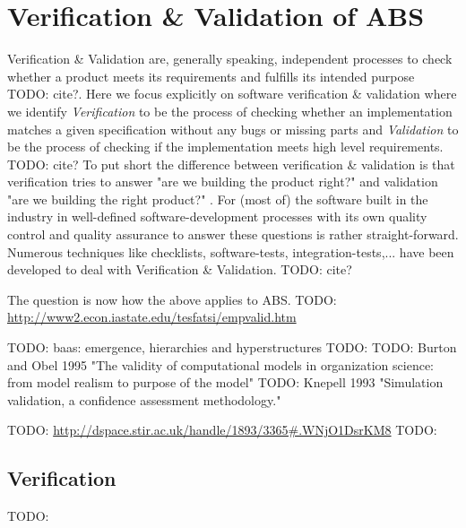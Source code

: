 \section{Verification \& Validation of ABS}
Verification \& Validation are, generally speaking, independent processes to check whether a product meets its requirements and fulfills its intended purpose TODO: cite?. Here we focus explicitly on software verification \& validation where we identify \textit{Verification} to be the process of checking whether an implementation matches a given specification without any bugs or missing parts and \textit{Validation} to be the process of checking if the implementation meets high level requirements. TODO: cite?
To put short the difference between verification \& validation is that verification tries to answer "are we building the product right?" and validation "are we building the right product?" \cite{boehm_software_1989}. For (most of) the software built in the industry in well-defined software-development processes with its own quality control and quality assurance to answer these questions is rather straight-forward. Numerous techniques like checklists, software-tests, integration-tests,... have been developed to deal with Verification \& Validation. TODO: cite?

The question is now how the above applies to ABS. TODO: \url{http://www2.econ.iastate.edu/tesfatsi/empvalid.htm}

TODO: baas: emergence, hierarchies and hyperstructures
TODO: \cite{baas_emergence_1997}
TODO: Burton and Obel 1995 "The validity of computational models in organization science: from model realism to purpose of the model"
TODO: Knepell 1993 "Simulation validation, a confidence assessment methodology."

TODO: \url{http://dspace.stir.ac.uk/handle/1893/3365#.WNjO1DsrKM8}
TODO: \cite{klugl_amason:_2013}

\subsection{Verification}
TODO: \cite{axelrod_advancing_1997}

